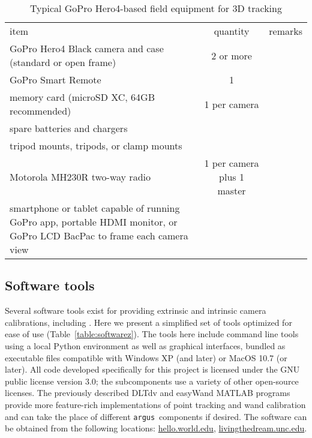 \documentclass[fleqn,10pt]{wlpeerj}
\newcommand{\argus}{\texttt{argus}}
\begin{document}
\begin{table}
\caption{Typical GoPro Hero4-based field equipment for 3D tracking}
\label{table:goodies}
\begin{center}
\begin{tabular}{lcl}
item & quantity & remarks \\
GoPro Hero4 Black camera and case (standard or open frame) & 2 or more & \\
GoPro Smart Remote & 1 & \\
memory card (microSD XC, 64GB recommended) & 1 per camera & \\
spare batteries and chargers & & \\
tripod mounts, tripods, or clamp mounts & & \\ 
Motorola MH230R two-way radio & 1 per camera plus 1 master & \\
smartphone or tablet capable of running GoPro app, portable HDMI monitor, or GoPro LCD BacPac to frame each camera view & & \\
\end{tabular}
\end{center}
\end{table}

\subsection*{Software tools}
Several software tools exist for providing extrinsic and intrinsic camera calibrations, including \citep{bouguet2004camera,Hedrick2008,lour09,Theriault:2014}.  Here we present a simplified set of tools optimized for ease of use (Table~\ref{table:softwarez}).  The tools here include command line tools using a local Python environment as well as graphical interfaces, bundled as executable files compatible with Windows XP (and later) or MacOS 10.7 (or later).  All code developed specifically for this project is licensed under the GNU public license version 3.0; the subcomponents use a variety of other open-source licenses. The previously described DLTdv \citep{Hedrick2008} and easyWand \citep{Theriault:2014} MATLAB programs provide more feature-rich implementations of point tracking and wand calibration and can take the place of different \argus\ components if desired.  The software can be obtained from the following locations: \url{hello.world.edu}, \url{livingthedream.unc.edu}. 
\end{document}
